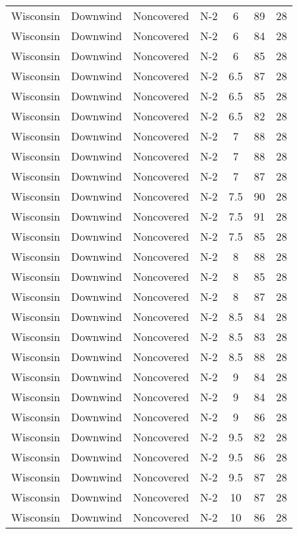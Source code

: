 \documentclass{article}
\begin{document}
\begin{longtable}[H]{ccccccc}
Wisconsin & Downwind & Noncovered & N-2 & 6    & 89  & 28 \\
Wisconsin & Downwind & Noncovered & N-2 & 6    & 84  & 28 \\
Wisconsin & Downwind & Noncovered & N-2 & 6    & 85  & 28 \\
Wisconsin & Downwind & Noncovered & N-2 & 6.5  & 87  & 28 \\
Wisconsin & Downwind & Noncovered & N-2 & 6.5  & 85  & 28 \\
Wisconsin & Downwind & Noncovered & N-2 & 6.5  & 82  & 28 \\
Wisconsin & Downwind & Noncovered & N-2 & 7    & 88  & 28 \\
Wisconsin & Downwind & Noncovered & N-2 & 7    & 88  & 28 \\
Wisconsin & Downwind & Noncovered & N-2 & 7    & 87  & 28 \\
Wisconsin & Downwind & Noncovered & N-2 & 7.5  & 90  & 28 \\
Wisconsin & Downwind & Noncovered & N-2 & 7.5  & 91  & 28 \\
Wisconsin & Downwind & Noncovered & N-2 & 7.5  & 85  & 28 \\
Wisconsin & Downwind & Noncovered & N-2 & 8    & 88  & 28 \\
Wisconsin & Downwind & Noncovered & N-2 & 8    & 85  & 28 \\
Wisconsin & Downwind & Noncovered & N-2 & 8    & 87  & 28 \\
Wisconsin & Downwind & Noncovered & N-2 & 8.5  & 84  & 28 \\
Wisconsin & Downwind & Noncovered & N-2 & 8.5  & 83  & 28 \\
Wisconsin & Downwind & Noncovered & N-2 & 8.5  & 88  & 28 \\
Wisconsin & Downwind & Noncovered & N-2 & 9    & 84  & 28 \\
Wisconsin & Downwind & Noncovered & N-2 & 9    & 84  & 28 \\
Wisconsin & Downwind & Noncovered & N-2 & 9    & 86  & 28 \\
Wisconsin & Downwind & Noncovered & N-2 & 9.5  & 82  & 28 \\
Wisconsin & Downwind & Noncovered & N-2 & 9.5  & 86  & 28 \\
Wisconsin & Downwind & Noncovered & N-2 & 9.5  & 87  & 28 \\
Wisconsin & Downwind & Noncovered & N-2 & 10   & 87  & 28 \\
Wisconsin & Downwind & Noncovered & N-2 & 10   & 86  & 28 \\

\end{longtable}
\end{document}
